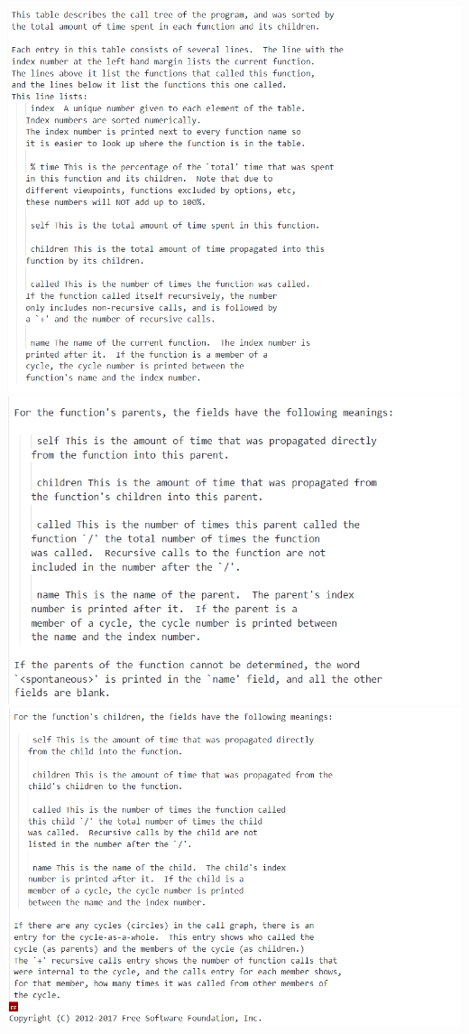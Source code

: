 \documentclass[12pt]{article}
\begin{document}
\includegraphics{profile_5.png}\\
\includegraphics{profile_6.png}\\
\includegraphics{profile_7.png}\\
\end{document}
